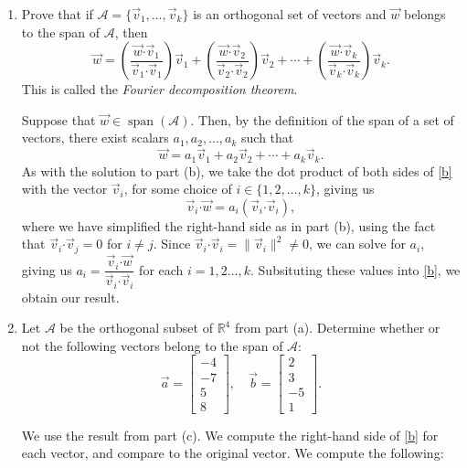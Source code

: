 \documentclass[letterpaper,12pt]{article}
\newcommand{\len}[1]{\lVert #1\rVert}
\newcommand{\R}{\mathbb{R}}
\newcommand{\dotp}{\boldsymbol{\cdot}}
\newcommand{\bbm}{\begin{bmatrix}}
\newcommand{\ebm}{\end{bmatrix}}
\begin{document}
\begin{enumerate}
\begin{enumerate}
\medskip



 \item Prove that if $\mathcal{A} = \{\vec{v}_1,\ldots, \vec{v}_k\}$ is an orthogonal set of vectors and $\vec{w}$ belongs to the span of $\mathcal{A}$, then
\[
 \vec{w} = \left(\frac{\vec{w}\dotp\vec{v}_1}{\vec{v}_1\dotp \vec{v}_1}\right)\vec{v}_1 + \left(\frac{\vec{w}\dotp\vec{v}_2}{\vec{v}_2\dotp\vec{v}_2}\right)\vec{v}_2+\cdots + \left(\frac{\vec{w}\dotp\vec{v}_k}{\vec{v}_k\dotp\vec{v}_k}\right)\vec{v}_k.
\]
This is called the \textit{Fourier decomposition theorem}.

\bigskip

Suppose that $\vec{w}\in \operatorname{span}(\mathcal{A})$. Then, by the definition of the span of a set of vectors, there exist scalars $a_1,a_2,\ldots, a_k$ such that
\begin{equation}\label{b}
 \vec{w} = a_1\vec{v}_1+a_2\vec{v}_2+\cdots +a_k\vec{v}_k.
\end{equation}
As with the solution to part (b), we take the dot product of both sides of \eqref{b} with the vector $\vec{v}_i$, for some choice of $i\in\{1,2,\ldots, k\}$, giving us
\[
 \vec{v}_i\dotp \vec{w} = a_i(\vec{v}_i\dotp\vec{v}_i),
\]
where we have simplified the right-hand side as in part (b), using the fact that $\vec{v}_i\dotp \vec{v}_j=0$ for $i\neq j$. Since $\vec{v}_i\dotp \vec{v}_i = \len{\vec{v}_i}^2\neq 0$, we can solve for $a_i$, giving us $a_i = \dfrac{\vec{v}_i\dotp \vec{w}}{\vec{v}_i\dotp \vec{v}_i}$ for each $i=1,2\ldots, k$. Subsituting these values into \eqref{b}, we obtain our result.

\medskip


 \item Let $\mathcal{A}$ be the orthogonal subset of $\R^4$ from part (a). Determine whether or not the following vectors belong to the span of $\mathcal{A}$:
\[
 \vec{a} = \bbm -4\\-7\\5\\8\ebm, \quad \vec{b} = \bbm 2\\3\\-5\\1\ebm.
\]

\bigskip

We use the result from part (c). We compute the right-hand side of \eqref{b} for each vector, and compare to the original vector. We compute the following:


\end{enumerate}
\end{enumerate}
\end{document}
